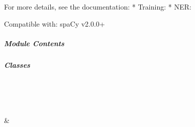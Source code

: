 \documentclass[letterpaper,10pt,english]{sphinxmanual}
\begin{document}
\subparagraph{}
\label{\detokenize{autoapi/pine/pipelines/run_service/index:module-pine.pipelines.run_service}}\label{\detokenize{autoapi/pine/pipelines/run_service/index:pine-pipelines-run-service}}\label{\detokenize{autoapi/pine/pipelines/run_service/index::doc}}

\subparagraph{}
\label{\detokenize{autoapi/pine/pipelines/spacy_NER_pipeline/index:module-pine.pipelines.spacy_NER_pipeline}}\label{\detokenize{autoapi/pine/pipelines/spacy_NER_pipeline/index:pine-pipelines-spacy-ner-pipeline}}\label{\detokenize{autoapi/pine/pipelines/spacy_NER_pipeline/index::doc}}
\sphinxAtStartPar
For more details, see the documentation:
* Training: 
* NER: 

\sphinxAtStartPar
Compatible with: spaCy v2.0.0+


\subparagraph{Module Contents}
\label{\detokenize{autoapi/pine/pipelines/spacy_NER_pipeline/index:module-contents}}

\subparagraph{Classes}
\label{\detokenize{autoapi/pine/pipelines/spacy_NER_pipeline/index:classes}}

\begin{savenotes}\sphinxatlongtablestart\begin{longtable}[c]{}
\hline

\endfirsthead

%
{}\\
\hline

\endhead

\hline
{}\\
\endfoot

\endlastfoot

\sphinxAtStartPar
{\hyperref[\detokenize{autoapi/pine/pipelines/spacy_NER_pipeline/index:pine.pipelines.spacy_NER_pipeline.spacy_NER}]{}}
&
\sphinxAtStartPar

\\
\hline
\end{longtable}\sphinxatlongtableend\end{savenotes}
\end{document}
